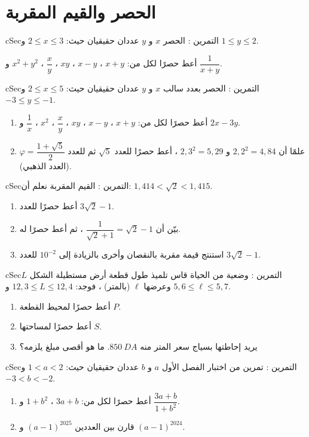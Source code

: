 \documentclass[12pt,a4paper]{article}
\newenvironment{BOX}[2]{\begin{otherlanguage}{english}\begin{arbox}{#1}{#2}}{\end{arbox}\end{otherlanguage}}
\newcounter{exo}
\newenvironment{tamrin}[1]{\stepcounter{exo}\begin{BOX}{cSec}{التمرين \theexo: #1}}{\end{BOX}}
\begin{document}
\section{الحصر والقيم المقربة}
\begin{tamrin}{الحصر}
$x$ و $y$ عددان حقيقيان حيث: $2\leqslant x\leqslant3$ و $1\leqslant y\leqslant2$.\par
أعط حصرًا لكل من: $x+y$ ، $x-y$ ، $xy$ ، $\dfrac xy$ ، $x^2+y^2$ و $\dfrac1{x+y}$.
\end{tamrin}

\begin{tamrin}{الحصر بعدد سالب}
$x$ و $y$ عددان حقيقيان حيث: $2\leqslant x\leqslant5$ و $-3\leqslant y\leqslant-1$.
\begin{enumerate}
\item أعط حصرًا لكل من: $x+y$ ، $x-y$ ، $xy$ ، $\dfrac xy$ ، $x^2$ ، $\dfrac1x$ و $2x-3y$.
\item علمًا أن $2{,}2^2=4{,}84$ و $2{,}3^2=5{,}29$ ، أعط حصرًا للعدد $\sqrt5$ ثم للعدد $\varphi=\dfrac{1+\sqrt5}2$ (العدد الذهبي).
\end{enumerate}
\end{tamrin}

\begin{tamrin}{القيم المقربة}
نعلم أن: $1{,}414<\sqrt2<1{,}415$.
\begin{enumerate}
\item أعط حصرًا للعدد $3\sqrt2-1$.
\item بيّن أن $\dfrac1{\sqrt2+1}=\sqrt2-1$ ، ثم أعط حصرًا له.
\item استنتج قيمة مقربة بالنقصان وأخرى بالزيادة إلى $10^{-2}$ للعدد $3\sqrt2-1$.
\end{enumerate}
\end{tamrin}

\begin{tamrin}{وضعية من الحياة}
قاس تلميذ طول قطعة أرض مستطيلة الشكل $L$ وعرضها $\ell$ (بالمتر) ، فوجد: $12{,}3\leqslant L\leqslant12{,}4$ و $5{,}6\leqslant\ell\leqslant5{,}7$.
\begin{enumerate}
\item أعط حصرًا لمحيط القطعة $P$.
\item أعط حصرًا لمساحتها $S$.
\item يريد إحاطتها بسياج سعر المتر منه $850\ DA$. ما هو أقصى مبلغ يلزمه؟
\end{enumerate}
\end{tamrin}

\begin{tamrin}{تمرين من اختبار الفصل الأول}
$a$ و $b$ عددان حقيقيان حيث: $1<a<2$ و $-3<b<-2$.
\begin{enumerate}
\item أعط حصرًا لكل من: $3a+b$ ، $1+b^2$ و $\dfrac{3a+b}{1+b^2}$.
\item قارن بين العددين $(a-1)^{2025}$ و $(a-1)^{2024}$.
\end{enumerate}
\end{tamrin}
\end{document}
